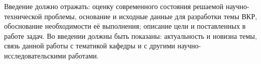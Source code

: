 
Введение должно отражать: оценку современного состояния решаемой 
научно-технической проблемы, основание и исходные данные для разработки 
темы ВКР, обоснование необходимости её выполнения; описание цели 
и поставленных в работе задач. Во введении должны быть показаны: 
актуальность и новизна темы, связь данной работы с тематикой кафедры 
и с другими научно-исследовательскими работами.